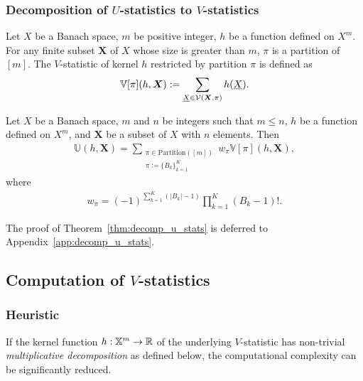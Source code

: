 \documentclass[letterpaper,11pt]{article}
\newcommand{\vset}{\calV}
\newcommand{\vsetp}[2]{\vset(#1,#2)}
\newcommand{\ustat}{\mathbb{U}}
\newcommand{\vstat}{\mathbb{V}}
\newcommand{\partition}{\mathrm{Partition}}
\newcommand{\partitionp}[1]{\partition(#1)}
\begin{document}
\begin{bibunit}[plainnat]
\subsubsection{Decomposition of \texorpdfstring{$U$}{U}-statistics to \texorpdfstring{$V$}{V}-statistics}

\begin{definition}\label{def:r_v_stat}
    Let $X$ be a Banach space, $m$ be positive integer, $h$ be a function defined on $X^m$. For any finite subset $\bm{X}$ of $X$ whose size is greater than $m$, $\pi$ is a partition of $[m]$. The $V$-statistic of kernel $h$ restricted by partition $\pi$ is defined as
    \begin{align*}
        \vstat[\pi](h,\bm{X}) := \sum_{\underline{X} \in \vsetp{\bm{X}}{\pi}} h(\underline{X}).
    \end{align*}
\end{definition}

\begin{theorem}\label{thm:decomp_u_stats}
Let $X$ be a Banach space, $m$ and $n$ be integers such that $m \leq n$, $h$ be a function defined on $X^m$, and $\bm{X}$ be a subset of $X$ with $n$ elements. Then
\begin{align*}
    \ustat(h,\bm{X}) = \sum_{\substack{ \pi \in \partitionp{[m]} \\ \pi := \{B_k\}_{k=1}^K} } w_\pi \vstat[\pi](h, \bm{X}), 
\end{align*}
where
\begin{align*}
    w_\pi = (-1)^{\sum_{k=1}^{K}(|B_k|-1)} \prod_{k=1}^K (B_k-1)!. 
\end{align*}
\end{theorem}

The proof of Theorem~\ref{thm:decomp_u_stats} is deferred to Appendix~\ref{app:decomp_u_stats}.

\subsection{Computation of \texorpdfstring{$V$}{V}-statistics}
\label{subsec:computation_of_V_statistics}
\subsubsection{Heuristic}
\label{subsubsec:computation_of_V_statistics_heuristic}
If the kernel function $h: {\mathbb{X}}^m \to {\mathbb{R}}$ of the underlying $V$-statistic has non-trivial \emph{multiplicative decomposition} as defined below, the computational complexity can be significantly reduced.


\end{bibunit}
\end{document}
